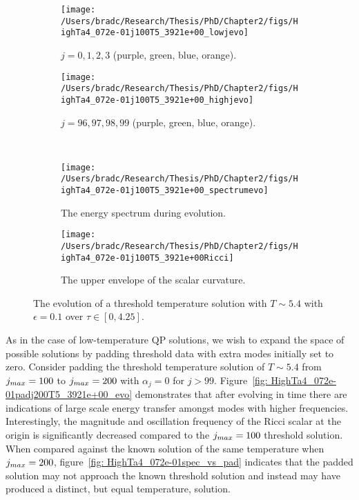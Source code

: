 \documentclass[../PhD.tex]{subfiles}
\begin{document}
\begin{figure}[ht]
	\centering
	\begin{subfigure}[t]{0.48\textwidth}
		\texttt{[image: /Users/bradc/Research/Thesis/PhD/Chapter2/figs/HighTa4\_072e-01j100T5\_3921e+00\_lowjevo]}
		\caption{$j = 0, 1, 2, 3$ (purple, green, blue, orange).}
	\end{subfigure}
	\hfill
	\begin{subfigure}[t]{0.48\textwidth}
		\texttt{[image: /Users/bradc/Research/Thesis/PhD/Chapter2/figs/HighTa4\_072e-01j100T5\_3921e+00\_highjevo]}
		\caption{$j=96, 97, 98, 99$ (purple, green, blue, orange).}
		\label{fig: HighTa4_072e-01j100T5_3921e+00_highjevo}
	\end{subfigure}
	\\
	\begin{subfigure}[t]{0.48\textwidth}
		\texttt{[image: /Users/bradc/Research/Thesis/PhD/Chapter2/figs/HighTa4\_072e-01j100T5\_3921e+00\_spectrumevo]}
		\caption{The energy spectrum during evolution.}
		\label{fig: HighTa4_072e-01j100T5_3921e+00_spectrumevo}
	\end{subfigure}
	\:
	\begin{subfigure}[t]{0.48\textwidth}
		\texttt{[image: /Users/bradc/Research/Thesis/PhD/Chapter2/figs/HighTa4\_072e-01j100T5\_3921e+00Ricci]}
		\caption{The upper envelope of the scalar curvature.}
		\label{fig: HighTa4_072e-01j100T5_3921e+00Ricci}
	\end{subfigure}
	\caption[Examining the energy per mode during the evolution of a threshold temperature solution]{The evolution of a threshold temperature solution with $T \sim 5.4$ with $\epsilon = 0.1$ over $\tau \in [0, 4.25]$.}
	\label{fig:HighTa4_072e-01j100T5_3921e+00_evo}
\end{figure}

As in the case of low-temperature QP solutions, we wish to expand the space of possible solutions by padding threshold data with extra modes initially set to zero. Consider padding the threshold temperature solution of $T \sim 5.4$ from $j_{max} = 100$ to $j_{max} = 200$ with $\alpha_j = 0$ for $j > 99$. Figure~\ref{fig: HighTa4_072e-01padj200T5_3921e+00_evo} demonstrates that after evolving in time there are indications of large scale energy transfer amongst modes with higher frequencies. Interestingly, the magnitude and oscillation frequency of the Ricci scalar at the origin is significantly decreased compared to the $j_{max} = 100$ threshold solution. When compared against the known solution of the same temperature when $j_{max} = 200$, figure~\ref{fig: HighTa4_072e-01spec_vs_pad} indicates that the padded solution may not approach the known threshold solution and instead may have produced a distinct, but equal temperature, solution.
\end{document}
